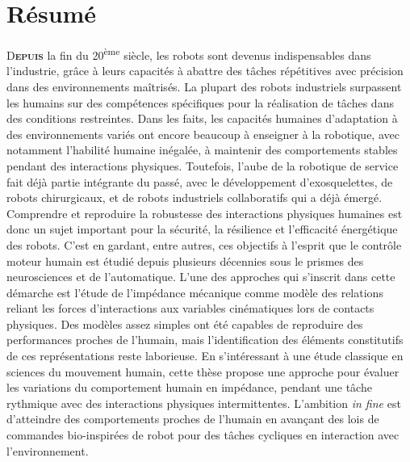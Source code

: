 \documentclass[12pt, a4paper]{article} %
\numberwithin{equation}{section}
\begin{document}
\section*{Résumé}
\vspace{15pt}
\lettrine{D}{\textbf{epuis}} la fin du 20\textsuperscript{ème} siècle, les robots sont devenus indispensables dans l'industrie, grâce à leurs capacités à abattre des tâches répétitives avec précision dans des environnements maîtrisés. La plupart des robots industriels surpassent les humains sur des compétences spécifiques pour la réalisation de tâches dans des conditions restreintes. Dans les faits, les capacités humaines d'adaptation à des environnements variés ont encore beaucoup à enseigner à la robotique, avec notamment l'habilité humaine inégalée, à maintenir des comportements stables pendant des interactions physiques. Toutefois, l'aube de la robotique de service fait déjà partie intégrante du passé, avec le développement d'exosquelettes, de robots chirurgicaux, et de robots industriels collaboratifs qui a déjà émergé. Comprendre et reproduire la robustesse des interactions physiques humaines est donc un sujet important pour la sécurité, la résilience et l'efficacité énergétique des robots. 
%
\newlineBlank
%
C'est en gardant, entre autres, ces objectifs à l'esprit que le contrôle moteur humain est étudié depuis plusieurs décennies sous le prismes des neurosciences et de l'automatique. L'une des approches qui s'inscrit dans cette démarche est l'étude de l'impédance mécanique comme modèle des relations reliant les forces d'interactions aux variables cinématiques lors de contacts physiques. Des modèles assez simples ont été capables de reproduire des performances proches de l'humain, mais l'identification des éléments constitutifs de ces représentations reste laborieuse. %
%
\newlineBlank
%
En s'intéressant à une étude classique en sciences du mouvement humain, cette thèse propose une approche pour évaluer les variations du comportement humain en impédance, pendant une tâche rythmique avec des interactions physiques intermittentes. L'ambition \textit{in fine} est d'atteindre des comportements proches de l'humain en avançant des lois de commandes bio-inspirées de robot pour des tâches cycliques en interaction avec l'environnement.

\vfill
\hspace{0pt}
\pagebreak
\end{document}
